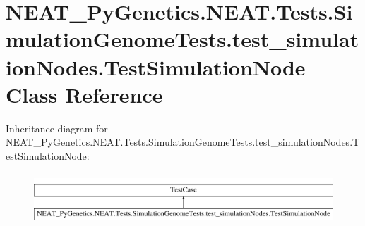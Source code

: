 \hypertarget{classNEAT__PyGenetics_1_1NEAT_1_1Tests_1_1SimulationGenomeTests_1_1test__simulationNodes_1_1TestSimulationNode}{}\section{N\+E\+A\+T\+\_\+\+Py\+Genetics.\+N\+E\+A\+T.\+Tests.\+Simulation\+Genome\+Tests.\+test\+\_\+simulation\+Nodes.\+Test\+Simulation\+Node Class Reference}
\label{classNEAT__PyGenetics_1_1NEAT_1_1Tests_1_1SimulationGenomeTests_1_1test__simulationNodes_1_1TestSimulationNode}
Inheritance diagram for N\+E\+A\+T\+\_\+\+Py\+Genetics.\+N\+E\+A\+T.\+Tests.\+Simulation\+Genome\+Tests.\+test\+\_\+simulation\+Nodes.\+Test\+Simulation\+Node\+:\begin{figure}[H]
\begin{center}
\leavevmode
\includegraphics[height=1.982301cm]{classNEAT__PyGenetics_1_1NEAT_1_1Tests_1_1SimulationGenomeTests_1_1test__simulationNodes_1_1TestSimulationNode}
\end{center}
\end{figure}
